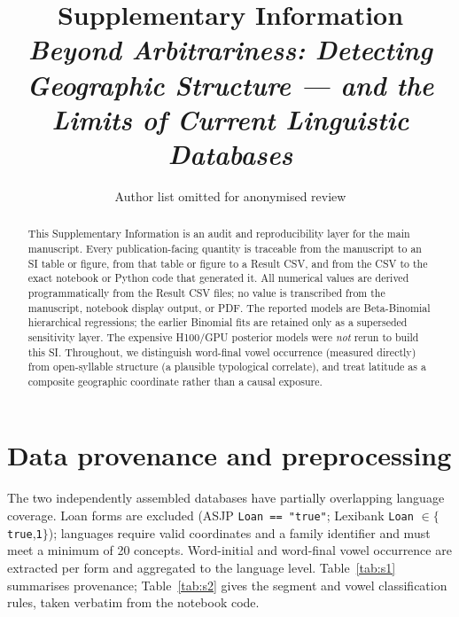 \documentclass[preprint,12pt]{elsarticle}
\begin{document}
\begin{frontmatter}
\title{Supplementary Information\\
\emph{Beyond Arbitrariness: Detecting Geographic Structure --- and the Limits of
Current Linguistic Databases}}
\author{Author list omitted for anonymised review}
\begin{abstract}
This Supplementary Information is an audit and reproducibility layer for the main
manuscript. Every publication-facing quantity is traceable from the manuscript to
an SI table or figure, from that table or figure to a Result CSV, and from the CSV
to the exact notebook or Python code that generated it. All numerical values are
derived programmatically from the Result CSV files; no value is transcribed from
the manuscript, notebook display output, or PDF. The reported models are
Beta-Binomial hierarchical regressions; the earlier Binomial fits are retained
only as a superseded sensitivity layer. The expensive H100/GPU posterior models
were \emph{not} rerun to build this SI. Throughout, we distinguish word-final vowel
occurrence (measured directly) from open-syllable structure (a plausible
typological correlate), and treat latitude as a composite geographic coordinate
rather than a causal exposure.
\end{abstract}
\end{frontmatter}

\tableofcontents
\clearpage

\section{Data provenance and preprocessing}
The two independently assembled databases have partially overlapping language
coverage. Loan forms are excluded (ASJP \texttt{Loan == "true"}; Lexibank
\texttt{Loan} $\in \{$\texttt{true},\texttt{1}$\}$); languages require valid
coordinates and a family identifier and must meet a minimum of 20 concepts.
Word-initial and word-final vowel occurrence are extracted per form and aggregated
to the language level. Table~\ref{tab:s1} summarises provenance; Table~\ref{tab:s2}
gives the segment and vowel classification rules, taken verbatim from the notebook
code.



\clearpage

\end{document}
